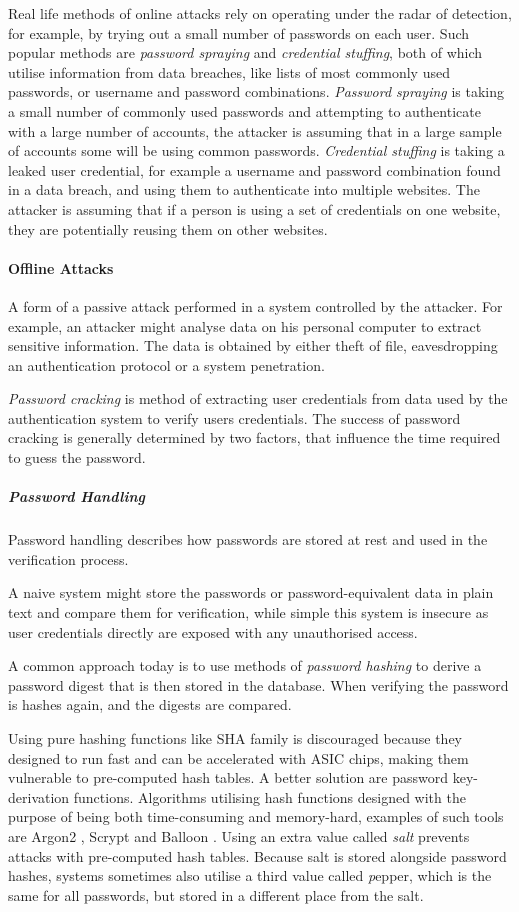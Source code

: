 Real life methods of online attacks rely on operating under the radar of detection, for example, by trying out a small number of passwords on each user.
Such popular methods are \textit{password spraying} and \textit{credential stuffing}, both of which utilise information from data breaches, like lists of most commonly used passwords, or username and password combinations.
\textit{Password spraying} is taking a small number of commonly used passwords and attempting to authenticate with a large number of accounts, the attacker is assuming that in a large sample of accounts some will be using common passwords.
\textit{Credential stuffing} is taking a leaked user credential, for example a username and password combination found in a data breach, and using them to authenticate into multiple websites. 
The attacker is assuming that if a person is using a set of credentials on one website, they are potentially reusing them on other websites.

\paragraph{Offline Attacks} 
A form of a passive attack performed in a system controlled by the attacker.
For example, an attacker might analyse data on his personal computer to extract sensitive information. The data is obtained by either theft of file, eavesdropping an authentication protocol or a system penetration.

\textit{Password cracking} is method of extracting user credentials from data used by the authentication system to verify users credentials.
The success of password cracking is generally determined by two factors, that influence the time required to guess the password.

\subparagraph{Password Handling}
Password handling describes how passwords are stored at rest and used in the verification process.

A naive system might store the passwords or password-equivalent data in plain text and compare them for verification, while simple this system is insecure as user credentials directly are exposed with any unauthorised access.

A common approach today is to use methods of \textit{password hashing} to derive a password digest that is then stored in the database. 
When verifying the password is hashes again, and the digests are compared.

Using pure hashing functions like SHA family is discouraged because they designed to run fast and can be accelerated with ASIC chips, making them vulnerable to pre-computed hash tables.
A better solution are password key-derivation functions. 
Algorithms utilising hash functions designed with the purpose of being both time-consuming and memory-hard, examples of such tools are Argon2 \cite{biryukov2016argon2}, Scrypt \cite{percival2016scrypt} and Balloon \cite{boneh2016balloon}.
Using an extra value called \textit{salt} \cite{hornby2016salted} prevents attacks with pre-computed hash tables.
Because salt is stored alongside password hashes, systems sometimes also utilise a third value called \textit pepper, which is the same for all passwords, but stored in a different place from the salt.


